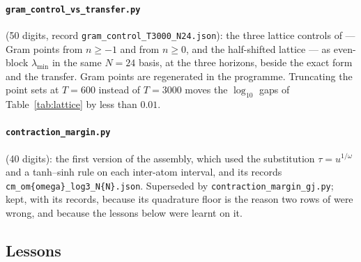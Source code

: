 \paragraph{\texttt{gram\_control\_vs\_transfer.py}} (50 digits, record
\texttt{gram\_control\_\allowbreak T3000\_N24.json}): the three lattice
controls of \cite[Section~3]{WilsonReview} --- Gram points from $n\geq-1$ and
from $n\geq0$, and the half-shifted lattice --- as even-block $\lambda_{\min}$ in
the same $N=24$ basis, at the three horizons, beside the exact form and the
transfer. Gram points are regenerated in the programme. Truncating the point
sets at $T=600$ instead of $T=3000$ moves the $\log_{10}$ gaps of
Table~\ref{tab:lattice} by less than $0.01$.

\paragraph{\texttt{contraction\_margin.py}} (40 digits): the first version of the
assembly, which used the substitution $\tau=u^{1/\omega}$ and a tanh--sinh rule
on each inter-atom interval, and its records \texttt{cm\_om\{omega\}\_log3\_N\{N\}.json}.
Superseded by \texttt{contraction\_margin\_gj.py}; kept, with its records,
because its quadrature floor is the reason two rows of \cite{ContractionNote}
were wrong, and because the lessons below were learnt on it.

\subsection*{Lessons}

